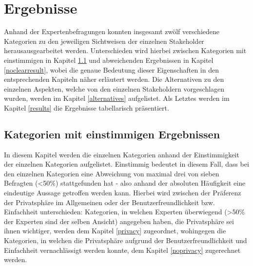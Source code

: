 \chapter{Ergebnisse} %
\label{Results} %
Anhand der Expertenbefragungen konnten insgesamt zwölf verschiedene Kategorien zu den jeweiligen Sichtweisen der einzelnen Stakeholder herausausgearbeitet werden. Unterschieden wird hierbei zwischen Kategorien mit einstimmigen in Kapitel \ref{clearresult} und abweichenden Ergebnissen in Kapitel \ref{noclearresult}, wobei die genaue Bedeutung dieser Eigenschaften in den entsprechenden Kapiteln näher erläutert werden.
Die Alternativen zu den einzelnen Aspekten, welche von den einzelnen Stakeholdern vorgeschlagen wurden, werden im Kapitel \ref{alternatives} aufgelistet. Als Letztes werden im Kapitel \ref{results}
die Ergebnisse tabellarisch präsentiert. 

\section{Kategorien mit einstimmigen Ergebnissen} \label{clearresult}
In diesem Kapitel werden die einzelnen Kategorien anhand der Einstimmigkeit der einzelnen Kategorien aufgelistet. Einstimmig bedeutet in diesem Fall, dass bei den einzelnen Kategorien eine Abweichung von maximal drei von sieben Befragten (<50\%) stattgefunden hat - also anhand
der absoluten Häufigkeit eine eindeutige Aussage getroffen werden kann. \newline 
Hierbei wird zwischen der Präferenz der Privatsphäre im Allgemeinen oder der Benutzerfreundlichkeit bzw. Einfachheit unterschieden: Kategorien, in welchen Experten überwiegend
(>50\% der Experten sind der selben Ansicht) angegeben haben, die Privatsphäre sei ihnen wichtiger, werden dem Kapitel \ref{privacy} zugeordnet, wohingegen die Kategorien, in welchen die Privatsphäre
aufgrund der Benutzerfreundlichkeit und Einfachheit vernachlässigt werden konnte, dem Kapitel \ref{noprivacy} zugerechnet werden.
